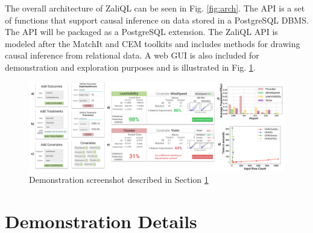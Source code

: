 The overall architecture of ZaliQL can be seen in Fig. \ref{fig:arch}. The API is a set of functions that support causal inference on data stored in a PostgreSQL DBMS. The API will be packaged as a PostgreSQL extension. The ZaliQL API is modeled after the MatchIt and CEM toolkits \cite{ho2005,iacus2009cem} and includes methods for drawing causal inference from relational data. A web GUI is also included for demonstration and exploration purposes and is illustrated in Fig. \ref{sfig:demo-tutorial}.

\begin{figure} \centering
\hspace*{-.1cm}
\includegraphics[scale=0.16]{Figures/Demo-Tutorial.png}
\caption{Demonstration screenshot described in Section \ref{sec:dd}}
\label{sfig:demo-tutorial}
\end{figure}

\vspace{-.3cm}
\section{Demonstration Details}
\label{sec:dd}

